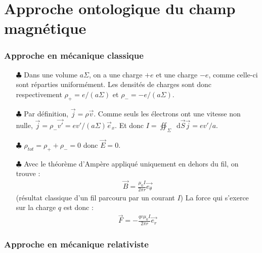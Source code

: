 \documentclass{report}
\newcommand*\dif{\mathop{}\!\mathrm{d}}
\begin{document}
\section*{Approche ontologique du champ magnétique}

\subsubsection*{Approche en mécanique classique}

\begin{itemize}
	\item[$\clubsuit$] Dans une volume $a\Sigma$, on a une charge $+e$ et une charge $-e$, comme celle-ci sont réparties uniformément. Les densités de charges sont donc respectivement $\rho_+=e/(a\Sigma)$ et $\rho_-=-e/(a\Sigma)$.
	\item[$\clubsuit$] Par définition, $\vec{j}=\rho\vec{v}$. Comme seuls les électrons ont une vitesse non nulle, $\vec{j}=\rho_-\vec{v'}=ev'/(a\Sigma)\vec{e}_x$. Et donc $I=\oiint_\Sigma\dif\vec{S}\vec{j}=ev'/a$.
	\item[$\clubsuit$] $\rho_{tot}=\rho_++\rho_-=0$ donc $\vec{E}=0$.
	\item[$\clubsuit$] Avec le théorème d'Ampère appliqué uniquement en dehors du fil, on trouve :
	\begin{align*}
		\vec{B}=\frac{\mu_0I}{2\pi r}\vec{e_\theta}
	\end{align*}
	(résultat classique d'un fil parcouru par un courant $I$)
	La force qui s'exerce sur la charge $q$ est donc :
	\begin{align*}
		\vec{F}=-\frac{qv\mu_0I}{2\pi r}\vec{e_r}
	\end{align*}
\end{itemize}

\subsubsection*{Approche en mécanique relativiste}
\end{document}
